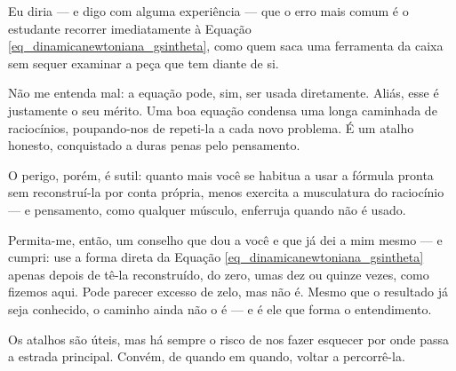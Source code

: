 

Eu diria — e digo com alguma experiência — que o erro mais comum é o estudante recorrer imediatamente à Equação \eqref{eq_dinamicanewtoniana_gsintheta}, como quem saca uma ferramenta da caixa sem sequer examinar a peça que tem diante de si.

Não me entenda mal: a equação pode, sim, ser usada diretamente. Aliás, esse é justamente o seu mérito. Uma boa equação condensa uma longa caminhada de raciocínios, poupando-nos de repeti-la a cada novo problema. É um atalho honesto, conquistado a duras penas pelo pensamento.

O perigo, porém, é sutil: quanto mais você se habitua a usar a fórmula pronta sem reconstruí-la por conta própria, menos exercita a musculatura do raciocínio — e pensamento, como qualquer músculo, enferruja quando não é usado.

Permita-me, então, um conselho que dou a você e que já dei a mim mesmo — e cumpri: use a forma direta da Equação \eqref{eq_dinamicanewtoniana_gsintheta} apenas depois de tê-la reconstruído, do zero, umas dez ou quinze vezes, como fizemos aqui. Pode parecer excesso de zelo, mas não é. Mesmo que o resultado já seja conhecido, o caminho ainda não o é — e é ele que forma o entendimento.

Os atalhos são úteis, mas há sempre o risco de nos fazer esquecer por onde passa a estrada principal. Convém, de quando em quando, voltar a percorrê-la.





